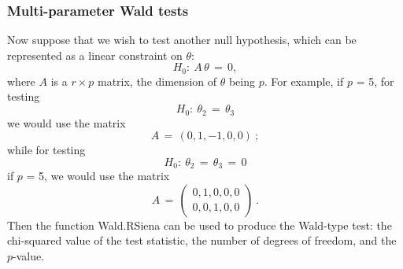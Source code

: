 \documentclass[a4paper,fleqn,11pt]{article}
\newcommand{\+}{\, + \,}
\newcommand{\sfn}[1]{\textsf{#1}}
\begin{document}
\subsubsection{Multi-parameter Wald tests}

Now suppose that we wish to test another null hypothesis,
which can be represented as a linear constraint on $\theta$:
\[
H_0 : \ A\,\theta \,=\, 0 ,
\]
where $A$ is a $r \times p$ matrix, the dimension of $\theta$ being $p$.
For example, if $p$ = 5, for testing
\[
H_0 : \ \theta_2 \,=\, \theta_3
\]
we would use the matrix
\[
   A \,=\, (0, 1, -1, 0, 0) \ ;
\]
while for testing
\[
H_0 : \ \theta_2 \,=\, \theta_3 \,=\, 0
\]
if $p$ = 5, we would use the matrix
\[
   A \,=\, \left( \begin{array}{l} 0, 1, 0, 0, 0 \\
                                   0, 0, 1, 0, 0
                  \end{array} \right) \ .
\]
Then the function \sfn{Wald.RSiena}
can be used to produce
the Wald-type test: the chi-squared value of the
test statistic, the number of degrees of freedom, and the $p$-value.
\end{document}

